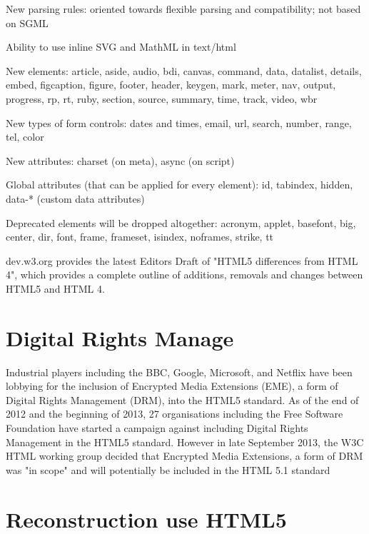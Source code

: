 \begin{compactitem}
\item New parsing rules: oriented towards flexible parsing and compatibility; not based on SGML
\item Ability to use inline SVG and MathML in text/html
\item New elements: article, aside, audio, bdi, canvas, command, data, datalist, details, embed, figcaption, figure, footer, header, keygen, mark, meter, nav, output, progress, rp, rt, ruby, section, source, summary, time, track, video, wbr
\item New types of form controls: dates and times, email, url, search, number, range, tel, color
\item New attributes: charset (on meta), async (on script)
\item Global attributes (that can be applied for every element): id, tabindex, hidden, data-* (custom data attributes)
\item Deprecated elements will be dropped altogether: acronym, applet, basefont, big, center, dir, font, frame, frameset, isindex, noframes, strike, tt
\end{compactitem}

dev.w3.org provides the latest Editors Draft of "HTML5 differences from HTML 4", which provides a complete outline of additions, removals and changes between HTML5 and HTML 4.



\chapter{Digital Rights Manage}


Industrial players including the BBC, Google, Microsoft, and Netflix have been lobbying for the inclusion of Encrypted Media Extensions (EME), a form of Digital Rights Management (DRM), into the HTML5 standard. As of the end of 2012 and the beginning of 2013, 27 organisations including the Free Software Foundation have started a campaign against including Digital Rights Management in the HTML5 standard. However in late September 2013, the W3C HTML working group decided that Encrypted Media Extensions, a form of DRM was "in scope" and will potentially be included in the HTML 5.1 standard






\chapter{Reconstruction use HTML5}












































